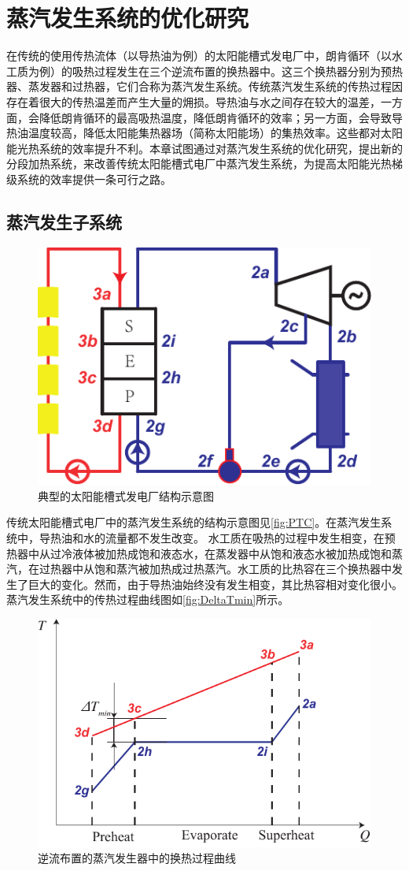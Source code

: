 \chapter{蒸汽发生系统的优化研究}
\label{cha:osgs}

在传统的使用传热流体（以导热油为例）的太阳能槽式发电厂中，朗肯循环（以水工质为例）的吸热过程发生在三个逆流布置的换热器中。这三个换热器分别为预热器、蒸发器和过热器，它们合称为蒸汽发生系统。传统蒸汽发生系统的传热过程因存在着很大的传热温差而产生大量的㶲损。导热油与水之间存在较大的温差，一方面，会降低朗肯循环的最高吸热温度，降低朗肯循环的效率；另一方面，会导致导热油温度较高，降低太阳能集热器场（简称太阳能场）的集热效率。这些都对太阳能光热系统的效率提升不利。本章试图通过对蒸汽发生系统的优化研究，提出新的分段加热系统，来改善传统太阳能槽式电厂中蒸汽发生系统，为提高太阳能光热梯级系统的效率提供一条可行之路。

\section{蒸汽发生子系统}

\begin{figure}[htbp]
	\centering
	\includegraphics[width = 0.4\columnwidth]{fig/PTC}
	\caption{典型的太阳能槽式发电厂结构示意图}
	\label{fig:PTC}
\end{figure}

传统太阳能槽式电厂中的蒸汽发生系统的结构示意图见\autoref{fig:PTC}。在蒸汽发生系统中，导热油和水的流量都不发生改变。
水工质在吸热的过程中发生相变，在预热器中从过冷液体被加热成饱和液态水，在蒸发器中从饱和液态水被加热成饱和蒸汽，在过热器中从饱和蒸汽被加热成过热蒸汽。水工质的比热容在三个换热器中发生了巨大的变化。然而，由于导热油始终没有发生相变，其比热容相对变化很小。蒸汽发生系统中的传热过程曲线图如\autoref{fig:DeltaTmin}所示。

\begin{figure}[htbp]
\centering
	\includegraphics[width = 0.5\columnwidth]{fig/DeltaTmin}
	\caption{逆流布置的蒸汽发生器中的换热过程曲线}
	\label{fig:DeltaTmin}
\end{figure}

